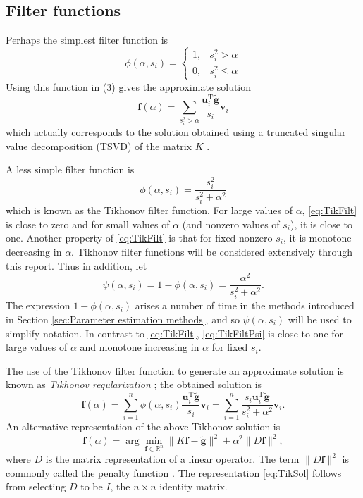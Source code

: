 \documentclass[12pt]{article}
\newcommand{\gnoise}{\widetilde{\mathbf{g}}}
\newcommand{\kmat}{K}	%
\newcommand{\fdis}{\mathbf{f}}
\newcommand{\trans}{\mathrm{T}}	%
\newcommand{\regparam}{\alpha}
\newcommand{\filt}{\phi}
\newcommand{\mfilt}{\psi}
\newcommand{\singular}{s}	%
\newcommand{\LSV}{\mathbf{u}}	%
\newcommand{\RSV}{\mathbf{v}}	%
\begin{document}
\subsection{Filter functions} \label{sec:Filter functions}
Perhaps the simplest filter function is
\[\filt(\regparam,\singular_i) = \begin{cases}
1, & \singular_i^2 > \regparam \\
0, & \singular_i^2 \leq \regparam
\end{cases}\]
Using this function in (3) gives the approximate solution
\[\fdis(\regparam) = \sum_{\singular_i^2 > \regparam} \frac{{\LSV^\trans_i}\gnoise}{\singular_i}\RSV_i\]
which actually corresponds to the solution obtained using a truncated singular value decomposition (TSVD) of the matrix $\kmat$ \cite{Vogel:2002}. \par
A less simple filter function is
\begin{equation}
\filt(\regparam,\singular_i)  = \frac{\singular_i^2}{\singular_i^2 + \regparam^2}
\label{eq:TikFilt}
\end{equation}
which is known as the Tikhonov filter function. For large values of $\regparam$, \eqref{eq:TikFilt} is close to zero and for small values of $\regparam$ (and nonzero values of $\singular_i$), it is close to one. Another property of \eqref{eq:TikFilt} is that for fixed nonzero $\singular_i$, it is monotone decreasing in $\regparam$. Tikhonov filter functions will be considered extensively through this report. Thus in addition, let
\begin{equation}
\mfilt(\regparam,\singular_i) = 1 - \filt(\regparam,\singular_i) = \frac{\regparam^2}{\singular_i^2 + \regparam^2}.
\label{eq:TikFiltPsi}
\end{equation}
The expression $1 - \filt(\regparam,\singular_i)$ arises a number of time in the methods introduced in Section \ref{sec:Parameter estimation methods}, and so $\mfilt(\regparam,\singular_i)$ will be used to simplify notation. In contrast to \eqref{eq:TikFilt}, \eqref{eq:TikFiltPsi} is close to one for large values of $\regparam$ and monotone increasing in $\regparam$ for fixed $\singular_i$. \par 
The use of the Tikhonov filter function to generate an approximate solution is known as \textit{Tikhonov regularization} \cite{Tikh1963}; the obtained solution is
\begin{equation}
\fdis(\regparam) = \sum_{i = 1}^n \filt(\regparam,\singular_i)\frac{{\LSV^\trans_i}\gnoise}{\singular_i}\RSV_i = \sum_{i = 1}^n \frac{\singular_i{\LSV^\trans_i}\gnoise}{\singular_i^2 + \regparam^2}\RSV_i.
\label{eq:TikSol}
\end{equation}
An alternative representation of the above Tikhonov solution is
\begin{equation}
\fdis(\regparam) = \arg\min_{\fdis \in \mathbb{R}^n} \|\kmat\fdis - \gnoise\|^2 + \regparam^2\|D\fdis\|^2,
\end{equation}
where $D$ is the matrix representation of a linear operator. The term $\|D\fdis\|^2$ is commonly called the penalty function \cite{Vogel:2002}. The representation \eqref{eq:TikSol} follows from selecting $D$ to be $I$, the $n \times n$ identity matrix. 
\end{document}

